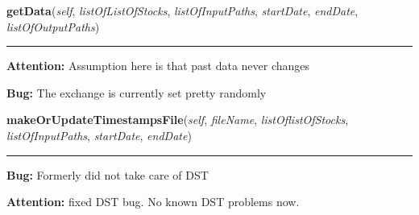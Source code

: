     \label{trunk:csvconverter:csvapi:StockPriceData:getData}

    \vspace{0.5ex}

\hspace{.8\funcindent}\begin{boxedminipage}{\funcwidth}

    \raggedright \textbf{getData}(\textit{self}, \textit{listOfListOfStocks}, \textit{listOfInputPaths}, \textit{startDate}, \textit{endDate}, \textit{listOfOutputPaths})

    \vspace{-1.5ex}

    \rule{\textwidth}{0.5\fboxrule}
\setlength{\parskip}{2ex}
\setlength{\parskip}{1ex}
\textbf{Attention:} Assumption here is that past data never changes



\textbf{Bug:} The exchange is currently set pretty randomly



    \end{boxedminipage}

    \label{trunk:csvconverter:csvapi:StockPriceData:makeOrUpdateTimestampsFile}

    \vspace{0.5ex}

\hspace{.8\funcindent}\begin{boxedminipage}{\funcwidth}

    \raggedright \textbf{makeOrUpdateTimestampsFile}(\textit{self}, \textit{fileName}, \textit{listOflistOfStocks}, \textit{listOfInputPaths}, \textit{startDate}, \textit{endDate})

    \vspace{-1.5ex}

    \rule{\textwidth}{0.5\fboxrule}
\setlength{\parskip}{2ex}
\setlength{\parskip}{1ex}
\textbf{Bug:} Formerly did not take care of DST



\textbf{Attention:} fixed DST bug. No known DST problems now.



    \end{boxedminipage}

